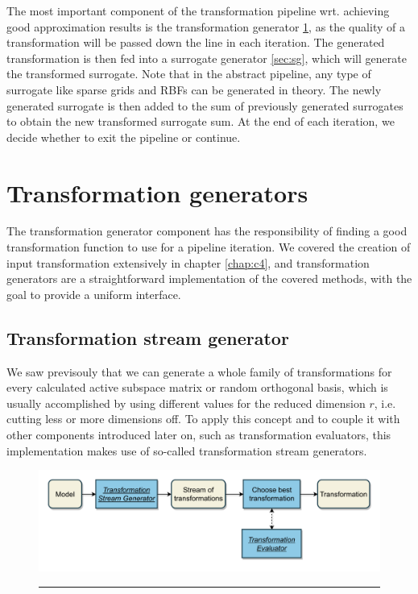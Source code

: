 \documentclass[
  a4paper,  %
  twoside,  %
  bibliography=totoc,
  headsepline,
  cleardoublepage=empty,
  parskip=half,
  draft=false
]{scrbook}
\newcommand{\delimit}{{\color{charcoal}\noindent\rule{\textwidth}{1pt}}}
\begin{document}
The most important component of the transformation pipeline wrt. achieving good approximation results is the transformation generator \cref{sec:tg}, as the quality of a transformation will be passed down the line in each iteration.
The generated transformation is then fed into a surrogate generator \cref{sec:sg}, which will generate the transformed surrogate.
Note that in the abstract pipeline, any type of surrogate like sparse grids and RBFs can be generated in theory.
The newly generated surrogate is then added to the sum of previously generated surrogates to obtain the new transformed surrogate sum.
At the end of each iteration, we decide whether to exit the pipeline or continue.


\newpage
\section {Transformation generators}
\label{sec:tg}

The transformation generator component has the responsibility of finding a good transformation function to use for a pipeline iteration.
We covered the creation of input transformation extensively in chapter \cref{chap:c4}, and transformation generators are a straightforward implementation of the covered methods, with the goal to provide a uniform interface.

\subsection {Transformation stream generator}

We saw previsouly that we can generate a whole family of transformations for every calculated active subspace matrix or random orthogonal basis, which is usually accomplished by using different values for the reduced dimension $r$, i.e. cutting less or more dimensions off.
To apply this concept and to couple it with other components introduced later on, such as transformation evaluators, this implementation makes use of so-called transformation stream generators.

\begin{mdframed}[style=style,frametitle={Transformation generator (stream-based)}]
\begin{figure}[H]
\includegraphics[width=\textwidth]{graphics/TransformationGen_Stream.pdf}
\delimit

\end{figure}
\end{mdframed}
\end{document}
